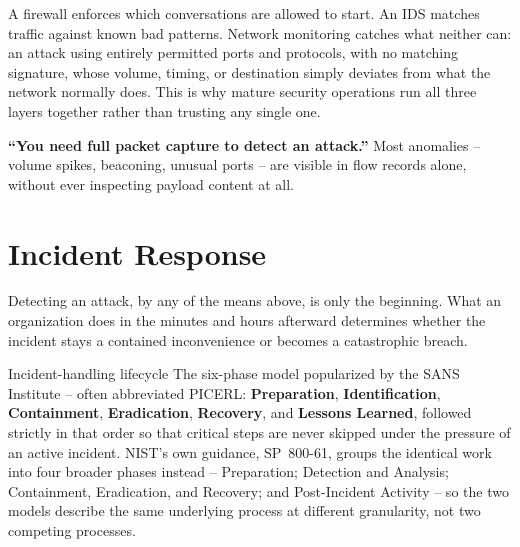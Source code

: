 A firewall enforces which conversations are allowed to start. An IDS matches traffic against known
bad patterns. Network monitoring catches what neither can: an attack using entirely permitted
ports and protocols, with no matching signature, whose volume, timing, or destination simply
deviates from what the network normally does. This is why mature security operations run all three
layers together rather than trusting any single one.

\begin{misconception}
\textbf{``You need full packet capture to detect an attack.''} Most anomalies -- volume spikes,
beaconing, unusual ports -- are visible in flow records alone, without ever inspecting payload
content at all.
\end{misconception}

\section{Incident Response}

Detecting an attack, by any of the means above, is only the beginning. What an organization does in
the minutes and hours afterward determines whether the incident stays a contained inconvenience or
becomes a catastrophic breach.

\begin{definition}{Incident-handling lifecycle}
The six-phase model popularized by the SANS Institute -- often abbreviated
PICERL: \textbf{Preparation}, \textbf{Identification},
\textbf{Containment}, \textbf{Eradication}, \textbf{Recovery}, and \textbf{Lessons Learned},
followed strictly in that order so that critical steps are never skipped under the pressure of an
active incident. NIST's own guidance, SP~800-61, groups the identical work into four broader
phases instead -- Preparation; Detection and Analysis; Containment, Eradication, and Recovery; and
Post-Incident Activity -- so the two models describe the same underlying process at
different granularity, not two competing processes.
\end{definition}

